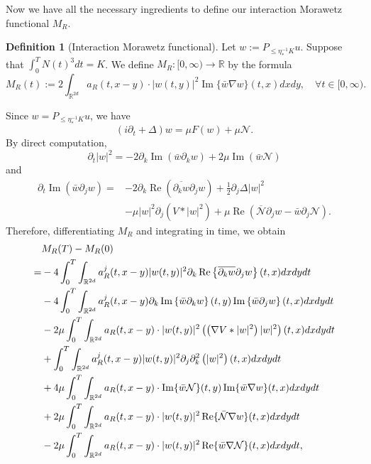 \documentclass[reqno,11pt]{amsart}
\theoremstyle{plain}
\theoremstyle{definition}
\newtheorem{definition}[theorem]{Definition}
\numberwithin{equation}{section}
\numberwithin{theorem}{section}
\def\leq{\leqslant}
\def\R{\mathbb{R}}
\begin{document}
Now we have all the necessary ingredients to define our interaction Morawetz functional $M_{R}$.

\begin{definition}[Interaction Morawetz functional] Let $w:=P_{\leq \eta_{\ast}^{-1} K} u$. Suppose that $\int_{0}^{T} N(t)^{3} d t=K$. We define $M_{R}:[0, \infty) \rightarrow \mathbb{R}$ by the formula
\begin{equation*}
M_{R}(t):=2 \int_{\mathbb{R}^{2d}} a_{R}(t, x-y) \cdot|w(t, y)|^{2} \operatorname{Im}\{\bar{w} \nabla w\}(t, x) d x d y, \quad \forall t \in[0, \infty).
\end{equation*}
\end{definition}

Since $w=P_{\leq\eta_{\ast}^{-1}K}u$, we have
\[
 (i\partial_t+\Delta)w=\mu F(w)+\mu\mathcal N.
\]
By direct computation,
\[
 \partial_t|w|^2=-2\partial_k\operatorname{Im}(\bar w\partial_kw)
 +2\mu\operatorname{Im}(\bar w\mathcal N)
\]
and
\begin{align*}
 \partial_t\operatorname{Im}(\bar w\partial_jw)
 ={}&-2\partial_k\operatorname{Re}(\overline{\partial_kw}\partial_jw)
 +\tfrac12\partial_j\Delta|w|^2\\
 &-\mu|w|^2\partial_j(V*|w|^2)
 +\mu\operatorname{Re}(\overline{\mathcal N}\partial_jw-\bar w\partial_j\mathcal N).
\end{align*}
Therefore, differentiating $M_R$ and integrating in time, we obtain
\begin{align}
&M_{R}(T)-M_{R}(0)\notag\\
=&  -4 \int_{0}^{T} \int_{\R^{2d}} a_{R}^{j}(t, x-y)|w(t, y)|^{2} \partial_{k} \operatorname{Re}\left\{\overline{\partial_{k} w} \partial_{j} w\right\}(t, x) d x d y d t \label{mo1}\\
& -4 \int_{0}^{T} \int_{\R^{2d}} a_{R}^{j}(t, x-y) \partial_k\operatorname{Im}\left\{\bar{w} \partial_{k} w\right\}(t, y) \operatorname{Im}\left\{\bar{w} \partial_{j} w\right\}(t, x) d x d y d t \label{mo2} \\
& -2\mu\int_{0}^{T} \int_{\R^{2d}} a_{R}(t, x-y) \cdot|w(t, y)|^{2}\left(\left(\nabla V *|w|^{2}\right)|w|^{2}\right)(t, x) d x d y d t \label{mo3}\\
& +\int_{0}^{T} \int_{\R^{2d}} a_{R}^{j}(t, x-y)|w(t, y)|^{2} \partial_{j} \partial_{k}^{2}\left(|w|^{2}\right)(t, x) d x d y d t \label{mo4}\\
& +4\mu \int_{0}^{T} \int_{\R^{2d}} a_{R}(t, x-y) \cdot \operatorname{Im}\{\bar{w} \mathcal{N}\}(t, y) \operatorname{Im}\{\bar{w} \nabla w\}(t, x) d x d y d t \label{mo6}\\
& +2\mu\int_{0}^{T} \int_{\R^{2d}} a_{R}(t, x-y) \cdot|w(t, y)|^{2} \operatorname{Re}\{\bar{\mathcal{N}}  \nabla w\}(t, x) d x d y d t \label{mo7}\\
& -2\mu \int_{0}^{T} \int_{\R^{2d}} a_{R}(t, x-y) \cdot|w(t, y)|^{2} \operatorname{Re}\{\bar{w} \nabla \mathcal{N}\}(t, x) d x d y d t,\label{mo8}
\end{align}
\end{document}
